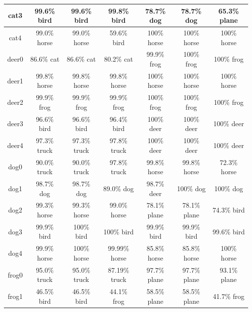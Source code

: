 \begin{longtable}{| c | c | c | c | c | c | c |}
 \hline
cat3 	\cellcolor{light-gray}	
& 99.6\% bird		
& 99.6\% bird 	
& 99.8\% bird 	
& 78.7\% dog 	
 & 78.7\% dog 	
 & 65.3\% plane\\
 \hline
cat4 	\cellcolor{light-gray}	
& 99.0\% horse		
& 99.0\% horse 	
& 59.6\% bird 	
& 100\% horse 	
 & 100\% horse 	
 & 100\% horse\\
 \hline
deer0\cellcolor{light-gray} 	
& 86.6\% cat 		
& 86.6\% cat 	
& 80.2\% cat 	
&  99.9\% frog 	
& 100\% frog 	
& 100\% frog\\
 \hline
deer1\cellcolor{light-gray} 	
& 99.8\% horse		
& 99.8\% horse 	
& 99.8\% horse 	
&  100\% horse 	 
& 100\% horse 	
& 100\% horse\\
 \hline
deer2\cellcolor{light-gray} 	
& 99.9\% frog		
& 99.9\% frog 	
& 99.9\% frog 	
&  100\% frog	
 & 100\% frog 	
 & 100\% frog\\
 \hline
deer3\cellcolor{light-gray} 	
& 96.6\% bird		
& 96.6\% bird 	
& 96.4\% bird 	
&  100\% deer\cellcolor{green}	 
& 100\% deer\cellcolor{green} 	
& 100\% deer\cellcolor{green}\\
 \hline
deer4\cellcolor{light-gray} 	
& 97.3\% truck		
& 97.3\% truck 	
& 97.8\% truck 	
&  100\% deer\cellcolor{green} 	 
& 100\% deer\cellcolor{green} 	
& 100\% deer\cellcolor{green}\\
 \hline
dog0 \cellcolor{light-gray}	
& 90.0\% truck		
& 90.0\% truck 	
& 97.8\% truck 	
&  99.8\% horse	 
& 99.8\% horse 
& 72.3\% horse\\
 \hline
dog1 \cellcolor{light-gray}	
& 98.7\% dog\cellcolor{green}		
& 98.7\% dog\cellcolor{green} 	
& 89.0\% dog\cellcolor{green} 	
&  98.7\% deer 	 
& 100\% dog\cellcolor{green} 	
& 100\% dog\cellcolor{green}\\
 \hline
dog2 \cellcolor{light-gray}	
& 99.3\% horse		
& 99.3\% horse  
& 99.0\% horse 	
&  78.1\% plane
& 78.1\% plane 
& 74.3\% bird\\
 \hline
dog3 \cellcolor{light-gray}	
& 99.9\% bird		
& 100\% bird 	
& 100\% bird 	
&  99.9\% bird	 
& 99.9\% bird 	
& 99.6\% bird\\
 \hline
dog4 \cellcolor{light-gray}	
& 99.9\% horse		
& 100\% horse 	
& 99.99\% horse 
&  85.8\% horse	
 & 85.8\% horse 
 & 100\% horse \\
 \hline
frog0 \cellcolor{light-gray}	
& 95.0\% truck		
& 95.0\% truck 	
& 87.19\% truck 
&  97.7\% plane
& 97.7\% plane 
& 93.1\% plane\\
 \hline
frog1 \cellcolor{light-gray}	
& 46.5\% bird		
& 46.5\% bird 	
& 44.1\% frog\cellcolor{green} 	
&  58.5\% plane& 58.5\% plane 
& 41.7\% frog\cellcolor{green}\\

\end{longtable}
